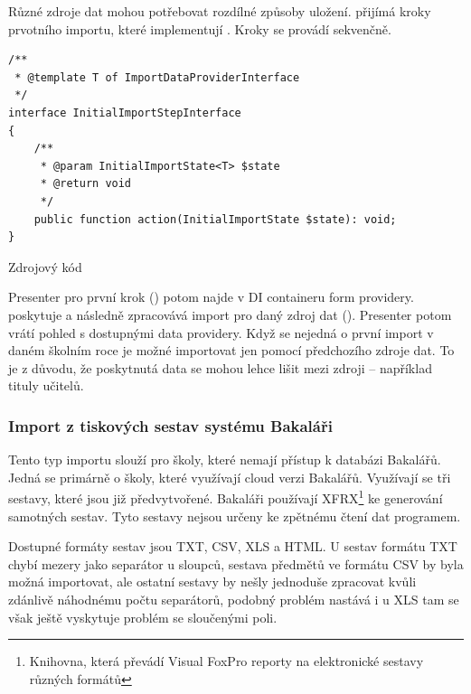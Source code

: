 Různé zdroje dat mohou potřebovat rozdílné způsoby uložení.  přijímá kroky prvotního importu, které implementují . Kroky se provádí sekvenčně.

\begin{code}[H]

  \begin{verbatim}
/**
 * @template T of ImportDataProviderInterface
 */
interface InitialImportStepInterface
{
    /**
     * @param InitialImportState<T> $state
     * @return void
     */
    public function action(InitialImportState $state): void;
}
   \end{verbatim}
  \caption{Zdrojový kód }

\end{code}


Presenter pro první krok () potom najde v DI containeru form providery.
 poskytuje a následně zpracovává import pro daný zdroj dat ().
Presenter potom vrátí pohled s dostupnými data providery.
Když se nejedná o první import v daném školním roce je možné importovat jen pomocí předchozího zdroje dat.
To je z důvodu, že poskytnutá data se mohou lehce lišit mezi zdroji -- například tituly učitelů. 





\subsubsection{Import z tiskových sestav systému Bakaláři}
Tento typ importu slouží pro školy, které nemají přístup k databázi Bakalářů. 
Jedná se primárně o školy, které využívají cloud verzi Bakalářů.
Využívají se tři sestavy, které jsou již předvytvořené.
Bakaláři používají XFRX\footnote{Knihovna, která převádí Visual FoxPro reporty na elektronické sestavy různých formátů} ke generování samotných sestav.
Tyto sestavy nejsou určeny ke zpětnému čtení dat programem.

Dostupné formáty sestav jsou TXT, CSV, XLS a HTML.
U sestav formátu TXT chybí mezery jako separátor u sloupců, sestava předmětů ve formátu CSV by byla možná importovat, ale ostatní sestavy by nešly jednoduše zpracovat kvůli zdánlivě náhodnému počtu separátorů, podobný problém nastává i u XLS tam se však ještě vyskytuje problém se sloučenými poli.

